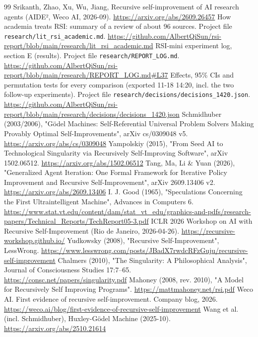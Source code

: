 \begin{thebibliography}{99}
\small
{} Srikanth, Zhao, Xu, Wu, Jiang, Recursive self-improvement of AI research agents (AIDE², Weco AI, 2026-09). \url{https://arxiv.org/abs/2609.26457}
 How academia treats RSI: summary of a review of about 96 sources. Project file \texttt{research/lit\_rsi\_academic.md}. \url{https://github.com/AlbertQiSun/rsi-report/blob/main/research/lit_rsi_academic.md}
 RSI-mini experiment log, section E (results). Project file \texttt{research/REPORT\_LOG.md}. \url{https://github.com/AlbertQiSun/rsi-report/blob/main/research/REPORT_LOG.md#L37}
 Effects, 95\% CIs and permutation tests for every comparison (exported 11-18 14:20, incl. the two follow-up experiments). Project file \texttt{research/decisions/decisions\_1420.json}. \url{https://github.com/AlbertQiSun/rsi-report/blob/main/research/decisions/decisions_1420.json}
 Schmidhuber (2003/2006), "Gödel Machines: Self-Referential Universal Problem Solvers Making Provably Optimal Self-Improvements", arXiv cs/0309048 v5. \url{https://arxiv.org/abs/cs/0309048}
 Yampolskiy (2015), "From Seed AI to Technological Singularity via Recursively Self-Improving Software", arXiv 1502.06512. \url{https://arxiv.org/abs/1502.06512}
 Tang, Ma, Li \& Yuan (2026), "Generalized Agent Iteration: One Formal Framework for Iterative Policy Improvement and Recursive Self-Improvement", arXiv 2609.13406 v2. \url{https://arxiv.org/abs/2609.13406}
 I. J. Good (1965), "Speculations Concerning the First Ultraintelligent Machine", Advances in Computers 6. \url{https://www.stat.vt.edu/content/dam/stat_vt_edu/graphics-and-pdfs/research-papers/Technical_Reports/TechReport05-3.pdf}
 ICLR 2026 Workshop on AI with Recursive Self-Improvement (Rio de Janeiro, 2026-04-26). \url{https://recursive-workshop.github.io/}
 Yudkowsky (2008), "Recursive Self-Improvement", LessWrong. \url{https://www.lesswrong.com/posts/JBadX7rwdcRFzGuju/recursive-self-improvement}
 Chalmers (2010), "The Singularity: A Philosophical Analysis", Journal of Consciousness Studies 17:7–65. \url{https://consc.net/papers/singularity.pdf}
 Mahoney (2008, rev. 2010), "A Model for Recursively Self Improving Programs". \url{https://mattmahoney.net/rsi.pdf}
 Weco AI. First evidence of recursive self-improvement. Company blog, 2026. \url{https://weco.ai/blog/first-evidence-of-recursive-self-improvement}
 Wang et al. (incl. Schmidhuber), Huxley-Gödel Machine (2025-10). \url{https://arxiv.org/abs/2510.21614}

\end{thebibliography}
